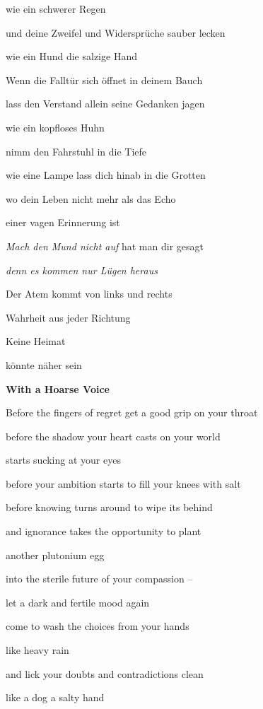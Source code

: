 wie ein schwerer Regen

und deine Zweifel und Widersprüche sauber lecken

wie ein Hund die salzige Hand


\bigskip

Wenn die Falltür sich öffnet in deinem Bauch

lass den Verstand allein seine Gedanken jagen

wie ein kopfloses Huhn

nimm den Fahrstuhl in die Tiefe

wie eine Lampe lass dich hinab in die Grotten

wo dein Leben nicht mehr als das Echo 

einer vagen Erinnerung ist


\bigskip

\emph{Mach den Mund nicht auf }hat man dir gesagt

\emph{
denn es kommen nur Lügen heraus }


\bigskip

Der Atem kommt von links und rechts

Wahrheit aus jeder Richtung

Keine Heimat 

könnte näher sein

{\bfseries
With a Hoarse Voice}


\bigskip

Before the fingers of regret get a good grip on your throat

before the shadow your heart casts on your world

starts sucking at your eyes

before your ambition starts to fill your knees with salt

before knowing turns around to wipe its behind

and ignorance takes the opportunity to plant 

another plutonium egg

into the sterile future of your compassion -- 


\bigskip

let a dark and fertile mood again 

come to wash the choices from your hands

like heavy rain

and lick your doubts and contradictions clean

like a dog a salty hand


\bigskip

